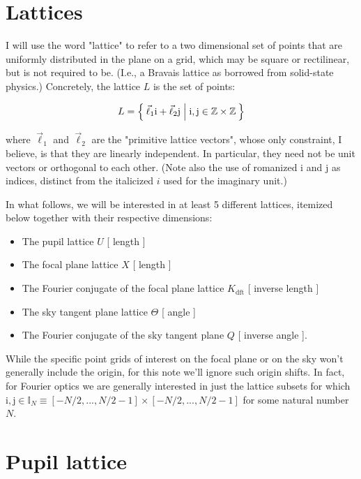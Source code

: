 \documentclass{article}
\begin{document}
\section{Lattices}

I will use the word "lattice" to refer to a two dimensional set of points that are uniformly
distributed in the plane on a grid, which may be square or rectilinear, but is not required to be.
(I.e., a Bravais lattice as borrowed from solid-state physics.) Concretely, the lattice $L$ is the
set of points:

\begin{equation}
    L = \Set{\vec{\ell}_1 \mathrm{i} + \vec{\ell}_2 \mathrm{j} | \mathrm{i},\mathrm{j} \in \mathbb{Z} \times \mathbb{Z}}
\end{equation}

where $\vec{\ell}_1$ and $\vec{\ell}_2$ are the "primitive lattice vectors", whose only constraint,
I believe, is that they are linearly independent.  In particular, they need not be unit vectors or
orthogonal to each other.  (Note also the use of romanized $\mathrm{i}$ and $\mathrm{j}$ as indices,
distinct from the italicized $i$ used for the imaginary unit.)

In what follows, we will be interested in at least 5 different lattices, itemized below together
with their respective dimensions:

\begin{itemize}
    \item The pupil lattice $U$ [ length ]
    \item The focal plane lattice $X$ [ length ]
    \item The Fourier conjugate of the focal plane lattice $K_\mathrm{dft}$ [ inverse length ]
    \item The sky tangent plane lattice $\Theta$ [ angle ]
    \item The Fourier conjugate of the sky tangent plane $Q$ [ inverse angle ].
\end{itemize}

While the specific point grids of interest on the focal plane or on the sky won't generally include
the origin, for this note we'll ignore such origin shifts.   In fact, for Fourier optics we are
generally interested in just the lattice subsets for which $\mathrm{i},\mathrm{j} \in \mathbb{I}_N
\equiv [-N/2, ..., N/2-1] \times [-N/2, ..., N/2-1]$ for some natural number $N$.

\section{Pupil lattice}
\end{document}
